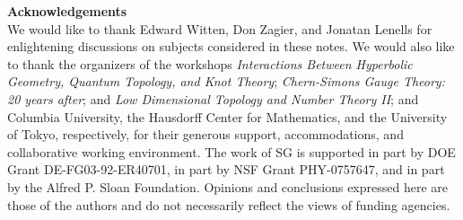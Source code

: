 \documentclass[letterpaper,12pt]{article}
\numberwithin{equation}{section}
\renewcommand{\=}{\;=\;}
\begin{document}
\vspace{1cm}
\noindent\textbf{Acknowledgements} \\
We would like to thank Edward Witten, Don Zagier, and Jonatan Lenells
for enlightening discussions on subjects considered in these notes.
We would also like to thank the organizers of the workshops
{\it Interactions Between Hyperbolic Geometry, Quantum Topology, and Knot Theory}; {\it Chern-Simons Gauge Theory: 20 years after}; and {\it Low Dimensional Topology and Number Theory II}; and Columbia University, the Hausdorff Center for Mathematics, and the University of Tokyo, respectively, for their generous support,
accommodations, and collaborative working environment.
The work of SG is supported in part by DOE Grant DE-FG03-92-ER40701,
in part by NSF Grant PHY-0757647, and in part by the Alfred P. Sloan Foundation.
Opinions and conclusions expressed here are those of the authors
and do not necessarily reflect the views of funding agencies.




\end{document}
